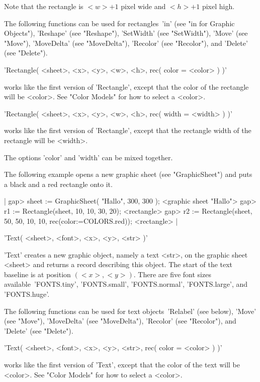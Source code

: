 Note that the rectangle is $<w>+1$ pixel wide and $<h>+1$ pixel high.

The  following functions can be used  for rectangles\:\ 'in' (see "in for
Graphic   Objects"),  'Reshape'    (see   "Reshape"),   'SetWidth'   (see
"SetWidth"),   'Move'    (see "Move"),  'MoveDelta'    (see "MoveDelta"),
'Recolor' (see "Recolor"), and 'Delete' (see "Delete").

'Rectangle( <sheet>, <x>, <y>, <w>, <h>, rec( color \:= <color> ) )'

works like the first version of 'Rectangle', except that the color of the
rectangle will  be  <color>.  See  "Color Models"  for   how to select  a
<color>.

'Rectangle( <sheet>, <x>, <y>, <w>, <h>, rec( width \:= <width> ) )'

works like the first  version of 'Rectangle',  except that  the rectangle
width of the rectangle will be <width>.

The options 'color' and 'width' can be mixed together.

The following example opens a  new graphic sheet (see "GraphicSheet") and
puts a black and a red rectangle onto it.

|    gap> sheet := GraphicSheet( "Hallo", 300, 300 );
    <graphic sheet "Hallo">
    gap> r1 := Rectangle(sheet, 10, 10, 30, 20);
    <rectangle>
    gap> r2 := Rectangle(sheet, 50, 50, 10, 10, rec(color:=COLORS.red));
    <rectangle> |


'Text( <sheet>, <font>, <x>, <y>, <str> )'

'Text' creates a new graphic object, namely  a text <str>, on the graphic
sheet <sheet> and returns  a {\GAP} record  describing this object.   The
start of the  text baseline is at position  $(<x>,<y>)$.  There  are five
font  sizes  available\:\  'FONTS.tiny',  'FONTS.small',  'FONTS.normal',
'FONTS.large', and 'FONTS.huge'.

The following functions  can be used  for text objects\:\ 'Relabel'  (see
below), 'Move'   (see "Move"), 'MoveDelta'  (see "MoveDelta"),  'Recolor'
(see "Recolor"), and 'Delete' (see "Delete").

'Text( <sheet>, <font>, <x>, <y>, <str>, rec( color \:= <color> ) )'

works like the first version of 'Text', except that the color of the text
will be <color>.  See "Color Models" for how to select a <color>.

